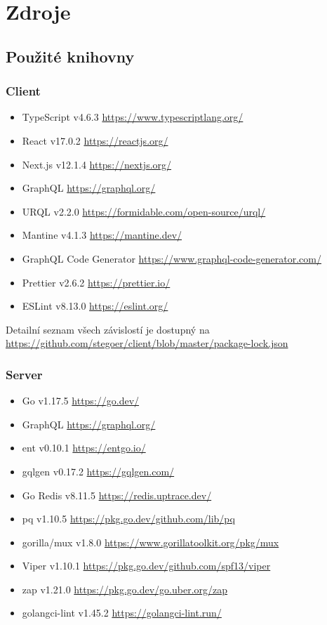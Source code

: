 
\section{Zdroje}\label{sec:zdroje}

\subsection{Použité knihovny}\label{subsec:pouzite-knihovny}

\subsubsection{Client}\label{subsubsec:client}
\begin{itemize}
    \item TypeScript v4.6.3 \url{https://www.typescriptlang.org/}
    \item React v17.0.2 \url{https://reactjs.org/}
    \item Next.js v12.1.4 \url{https://nextjs.org/}
    \item GraphQL \url{https://graphql.org/}
    \item URQL v2.2.0 \url{https://formidable.com/open-source/urql/}
    \item Mantine v4.1.3 \url{https://mantine.dev/}
    \item GraphQL Code Generator \url{https://www.graphql-code-generator.com/}
    \item Prettier v2.6.2 \url{https://prettier.io/}
    \item ESLint v8.13.0 \url{https://eslint.org/}
\end{itemize}

Detailní seznam všech závislostí je dostupný na
\url{https://github.com/stegoer/client/blob/master/package-lock.json}

\subsubsection{Server}\label{subsubsec:server}
\begin{itemize}
    \item Go v1.17.5 \url{https://go.dev/}
    \item GraphQL \url{https://graphql.org/}
    \item ent v0.10.1 \url{https://entgo.io/}
    \item gqlgen v0.17.2 \url{https://gqlgen.com/}
    \item Go Redis v8.11.5 \url{https://redis.uptrace.dev/}
    \item pq v1.10.5 \url{https://pkg.go.dev/github.com/lib/pq}
    \item gorilla/mux v1.8.0 \url{https://www.gorillatoolkit.org/pkg/mux}
    \item Viper v1.10.1 \url{https://pkg.go.dev/github.com/spf13/viper}
    \item zap v1.21.0 \url{https://pkg.go.dev/go.uber.org/zap}
    \item golangci-lint v1.45.2 \url{https://golangci-lint.run/}
\end{itemize}

